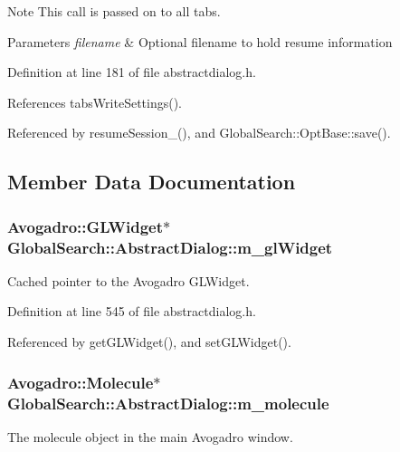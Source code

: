 \begin{DoxyNote}{Note}
This call is passed on to all tabs. 
\end{DoxyNote}

\begin{DoxyParams}{Parameters}
{\em filename} & Optional filename to hold resume information \\
\hline
\end{DoxyParams}


Definition at line 181 of file abstractdialog.\+h.



References tabs\+Write\+Settings().



Referenced by resume\+Session\+\_\+(), and Global\+Search\+::\+Opt\+Base\+::save().



\subsection{Member Data Documentation}
\hypertarget{classGlobalSearch_1_1AbstractDialog_a18c6963416c0b49012fa94fd451c96d9}{}
\subsubsection[{m\+\_\+gl\+Widget}]{\setlength{\rightskip}{0pt plus 5cm}Avogadro\+::\+G\+L\+Widget$\ast$ Global\+Search\+::\+Abstract\+Dialog\+::m\+\_\+gl\+Widget\hspace{0.3cm}{\ttfamily [protected]}}\label{classGlobalSearch_1_1AbstractDialog_a18c6963416c0b49012fa94fd451c96d9}
Cached pointer to the Avogadro G\+L\+Widget. 

Definition at line 545 of file abstractdialog.\+h.



Referenced by get\+G\+L\+Widget(), and set\+G\+L\+Widget().

\hypertarget{classGlobalSearch_1_1AbstractDialog_a9cf65fe592eebca0ec72a5597edc7faf}{}
\subsubsection[{m\+\_\+molecule}]{\setlength{\rightskip}{0pt plus 5cm}Avogadro\+::\+Molecule$\ast$ Global\+Search\+::\+Abstract\+Dialog\+::m\+\_\+molecule\hspace{0.3cm}{\ttfamily [protected]}}\label{classGlobalSearch_1_1AbstractDialog_a9cf65fe592eebca0ec72a5597edc7faf}
The molecule object in the main Avogadro window. 

